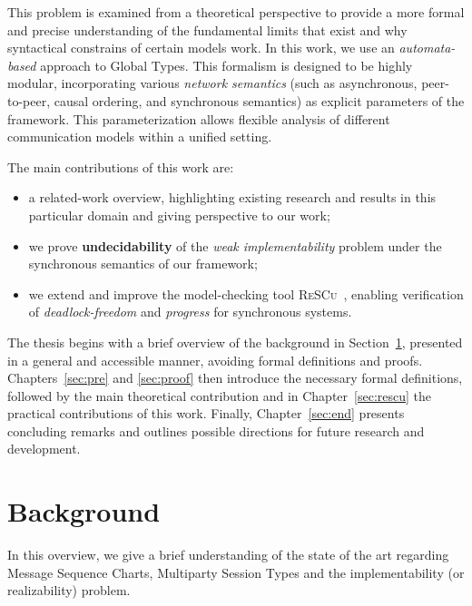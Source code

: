 This problem is examined from a theoretical
perspective to provide a more formal and precise understanding of
the fundamental limits that exist and why syntactical constrains
of certain models work.
In this work, we use an \textit{automata-based} approach to Global Types. 
This formalism is designed to be highly modular, 
incorporating various \textit{network semantics} (such as asynchronous, 
peer-to-peer, causal ordering, and synchronous semantics) as explicit 
parameters of the framework. This parameterization allows flexible 
analysis of different communication models within a unified setting.

The main contributions of this work are: 
\begin{itemize}
    \item a related-work overview, highlighting
    existing research and results in this particular domain and giving
    perspective to our work;
    \item we prove \textbf{undecidability} of the \textit{weak implementability} 
    problem under the synchronous semantics of our framework;
    \item we extend and improve the model-checking tool \textsc{ReSCu}~\cite{rescurepo},  
    enabling verification of \textit{deadlock-freedom} and \textit{progress} 
    for synchronous systems.
\end{itemize}
The thesis begins with a brief overview of the background
in Section~\ref{sec:sota}, presented in a general and accessible manner, avoiding
formal definitions and proofs. Chapters~\ref{sec:pre} and
\ref{sec:proof} then introduce the necessary formal definitions,
followed by the main theoretical contribution and in 
Chapter~\ref{sec:rescu} the practical contributions of
this work. Finally, Chapter~\ref{sec:end} presents concluding
remarks and outlines possible directions for future research and
development.


\section{Background}\label{sec:sota}
In this overview, we give a brief understanding of the
state of the art regarding Message Sequence Charts, Multiparty 
Session Types and the implementability 
(or realizability) problem.

